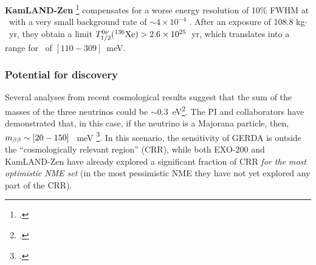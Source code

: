\documentclass[a4paper,11pt,oneside]{article}
\begin{document}
{\bf KamLAND-Zen} \footcite{TheKamLAND-Zen:2014lma} compensates for a worse energy resolution of 10\% FWHM at \Qbb\ with a very small background rate of $\sim 4 \times 10^{-4}$ \ckky. After an exposure of 108.8 kg$\cdot$~yr, they obtain a limit  $T_{1/2}^{0\nu}({}^{136}\rm Xe) > 2.6 \times 10^{25}$~yr, which translates into a range for \mbb\ of $[110-309]$~meV.

 \subsubsection*{Potential for discovery}
 Several analyses from recent cosmological results suggest that the sum of the masses of the three neutrinos could be $\sim$0.3~eV\footcite{PhysRevLett.112.051303}. The PI and collaborators have demonstrated that, in this case, if the neutrino is a Majorana particle, then, $m_{\beta\beta} \sim [20-150]$~ meV \footcite{GomezCadenas:2013ue}. In this scenario, the sensitivity of GERDA is outside the ``cosmologically relevant region'' (CRR), while both EXO-200 and KamLAND-Zen have already explored a significant fraction of CRR {\em for the most optimistic NME set} (in the most pessimistic NME they have not yet explored any part of the CRR). 
 
% 
 
\end{document}
